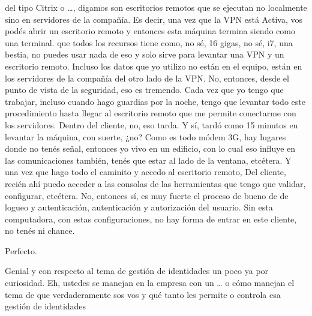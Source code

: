 \begin{description}[leftmargin=0cm, labelsep=0.5cm]
del tipo Citrix o …, digamos son escritorios remotos que se ejecutan no localmente sino en servidores de la compañía. Es decir, una vez que la VPN está Activa, vos podés abrir un escritorio remoto y entonces esta máquina termina siendo como una terminal. que todos los recursos tiene como, no sé, 16 gigas, no sé, i7, una bestia, no puedes usar nada de eso y solo sirve para levantar una VPN y un escritorio remoto. Incluso los datos que yo utilizo no están en el equipo, están en los servidores de la compañía del otro lado de la VPN. No, entonces, desde el punto de vista de la seguridad, eso es tremendo. Cada vez que yo tengo que trabajar, incluso cuando hago guardias por la noche, tengo que levantar todo este procedimiento hasta llegar al escritorio remoto que me permite conectarme con los servidores. Dentro del cliente, no, eso tarda. Y sí, tardó como 15 minutos en levantar la máquina, con suerte, ¿no? Como es todo módem 3G, hay lugares donde no tenés señal, entonces yo vivo en un edificio, con lo cual eso influye en las comunicaciones también, tenés que estar al lado de la ventana, etcétera. Y una vez que hago todo el caminito y accedo al escritorio remoto, Del cliente, recién ahí puedo acceder a las consolas de las herramientas que tengo que validar, configurar, etcétera. No, entonces sí, es muy fuerte el proceso de bueno de de logueo y autenticación, autenticación y autorización del usuario. Sin esta computadora, con estas configuraciones, no hay forma de entrar en este cliente, no tenés ni chance.

    \item[\textbf{MUNTAABSKI FEDERICO:}] Perfecto.

    \item[\textbf{MOCIULSKY SANTIAGO:}] Genial y con respecto al tema de gestión de identidades un poco ya por curiosidad. Eh, ustedes se manejan en la empresa con un … o cómo manejan el tema de que verdaderamente sos vos y qué tanto les permite o controla esa gestión de identidades


\end{description}
